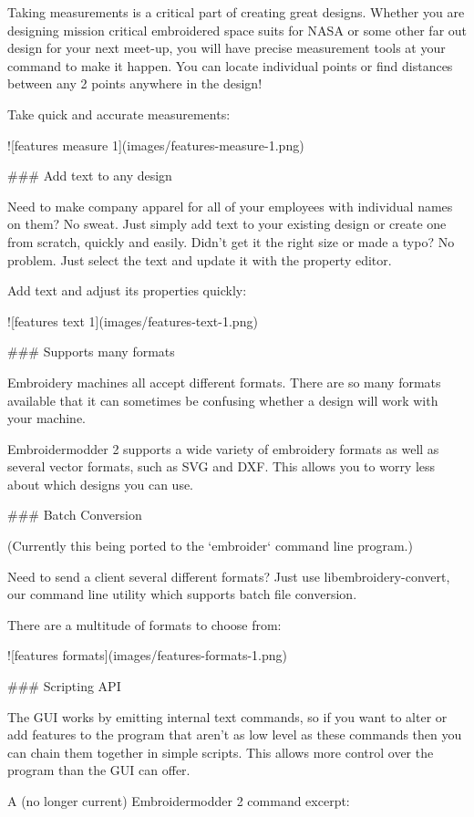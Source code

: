 Taking measurements is a critical part of creating great designs. Whether you are designing
mission critical embroidered space suits for NASA or some other far out design for your next
meet-up, you will have precise measurement tools at your command to make it happen. You can
locate individual points or find distances between any 2 points anywhere in the design!

Take quick and accurate measurements:

![features measure 1](images/features-measure-1.png)

### Add text to any design

Need to make company apparel for all of your employees with individual names on them? No sweat.
Just simply add text to your existing design or create one from scratch, quickly and easily.
Didn't get it the right size or made a typo? No problem. Just select the text and update it
with the property editor.

Add text and adjust its properties quickly:

![features text 1](images/features-text-1.png)

### Supports many formats

Embroidery machines all accept different formats. There are so many formats available that it
can sometimes be confusing whether a design will work with your machine.

Embroidermodder 2 supports a wide variety of embroidery formats as well as several vector
formats, such as SVG and DXF. This allows you to worry less about which designs you can use.

### Batch Conversion

(Currently this being ported to the `embroider` command line program.)

Need to send a client several different formats? Just use libembroidery-convert, our command
line utility which supports batch file conversion.

There are a multitude of formats to choose from:

![features formats](images/features-formats-1.png)

### Scripting API

The GUI works by emitting internal text commands, so if you want to alter
or add features to the program that aren't as low level as these commands then you
can chain them together in simple scripts. This allows more control over the program than
the GUI can offer.

A (no longer current) Embroidermodder 2 command excerpt:

